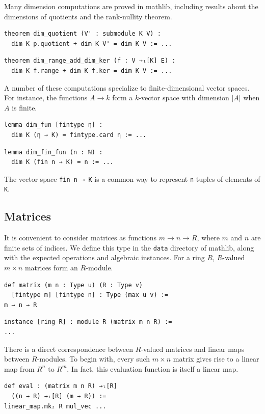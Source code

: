\documentclass[sigplan]{acmart}\settopmatter{}
\newcommand{\mathlib}{\textsf{mathlib}\xspace}
\begin{document}
Many dimension computations are proved in \mathlib,
including results about the dimensions of quotients
and the rank-nullity theorem.

\begin{lstlisting}
theorem dim_quotient (V' : submodule K V) :
  dim K p.quotient + dim K V' = dim K V := ...
\end{lstlisting}
\begin{lstlisting}
theorem dim_range_add_dim_ker (f : V →ₗ[K] E) :
  dim K f.range + dim K f.ker = dim K V := ...
\end{lstlisting}
A number of these computations specialize to finite-dim\-ensional vector spaces.
For instance, the functions $A \to k$ form a $k$-vector space
with dimension $|A|$ when $A$ is finite.

\begin{lstlisting}
lemma dim_fun [fintype η] :
  dim K (η → K) = fintype.card η := ...
\end{lstlisting}
\begin{lstlisting}
lemma dim_fin_fun (n : ℕ) :
  dim K (fin n → K) = n := ...
\end{lstlisting}
The vector space \lstinline{fin n → K} is a common way to represent \lstinline{n}-tuples of elements of \lstinline{K}.

\subsection{Matrices}
\label{subsection:linalg:matrices}

It is convenient to consider matrices as functions $m \to n \to R$, where $m$ and $n$ are finite sets of indices.
We define this type in the \lstinline{data} directory of \mathlib,
along with the expected operations and algebraic instances.
For a ring $R$, $R$-valued $m \times n$ matrices form an $R$-module.
\begin{lstlisting}
def matrix (m n : Type u) (R : Type v)
  [fintype m] [fintype n] : Type (max u v) :=
m → n → R
\end{lstlisting}
\begin{lstlisting}
instance [ring R] : module R (matrix m n R) :=
...
\end{lstlisting}
There is a direct correspondence between $R$-valued matrices and linear maps between $R$-modules.
To begin with, every such $m \times n$ matrix gives rise to a linear map from $R^n$ to $R^m$.
In fact, this evaluation function is itself a linear map.
\begin{lstlisting}
def eval : (matrix m n R) →ₗ[R]
  ((n → R) →ₗ[R] (m → R)) :=
linear_map.mk₂ R mul_vec ...
\end{lstlisting}
\end{document}
